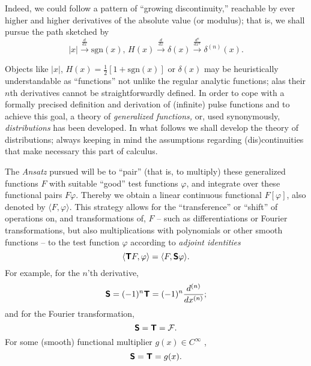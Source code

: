 
Indeed, we could follow a pattern of ``growing discontinuity,''
reachable by ever higher and higher derivatives of the
absolute value (or modulus); that is, we shall pursue the path sketched by
$$
\vert x\vert
\stackrel{\frac{d}{dx}  }{  \longrightarrow}
\textrm{sgn}(x) ,\,
H(x)
\stackrel{\frac{d}{dx} }{ \longrightarrow}
\delta (x)
\stackrel{\frac{d^n}{dx^n} }{ \longrightarrow}
\delta^{(n)} (x)
.
$$



Objects like $\vert x\vert$,  $H(x)=\frac{1}{2}\left[ 1+\textrm{sgn}(x)\right]$ or $\delta (x)$ may be heuristically understandable
as ``functions'' not unlike
the regular analytic functions; alas
their $n$th derivatives cannot be straightforwardly defined.
In order to cope with a formally precised definition
and derivation of (infinite) pulse functions and to achieve this goal,
a theory of  {\em  generalized functions,}
or, used synonymously,
{\em distributions}
has been developed.
In what follows we shall
develop the theory of distributions;
always keeping in mind the assumptions
regarding (dis)continuities
that make necessary this part of calculus.

The {\it Ansatz} pursued will be to ``pair'' (that is, to multiply) these generalized functions $F$ with suitable ``good''
test functions $\varphi$,
and integrate over these functional pairs $F \varphi$.
Thereby we obtain a linear continuous functional
$F[\varphi]$,
also denoted by
$\langle F, \varphi \rangle $.
This strategy allows for the
``transference'' or ``shift'' of operations on, and transformations of, $F$
-- such as differentiations or Fourier transformations, but also multiplications with polynomials or other smooth functions --
to the test function $\varphi$ according to
{\em adjoint identities}
\begin{equation}
\langle \textsf{\textbf{T}} F, \varphi \rangle
=
\langle F, \textsf{\textbf{S}} \varphi \rangle.
\end{equation}
For example,
for the $n$'th derivative,
\begin{equation}
\textsf{\textbf{S}} = (-1)^n \textsf{\textbf{T}} = (-1)^n \frac{d^{(n)}}{dx^{(n)}};
\end{equation}
and for the Fourier transformation,
\begin{equation}
\textsf{\textbf{S}} =   \textsf{\textbf{T}} = {\cal F} .
\end{equation}
For some (smooth) functional multiplier $g(x)\in C^\infty$ ,
\begin{equation}
\textsf{\textbf{S}} =   \textsf{\textbf{T}} = g(x) .
\label{2013-m-ch-di-multipl}
\end{equation}


